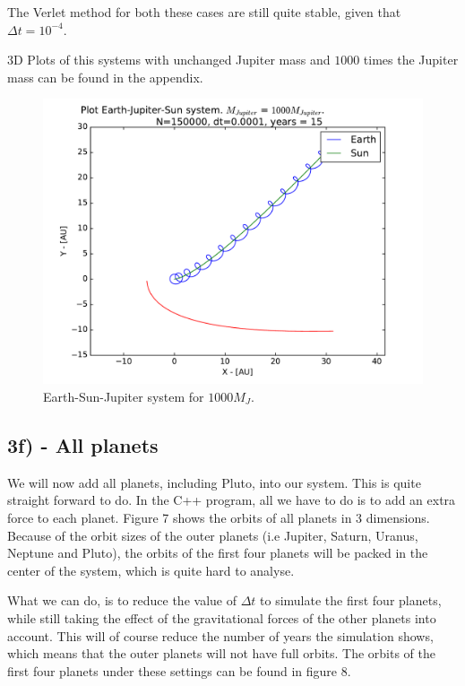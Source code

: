 \documentclass[12pt]{article}
\begin{document}
The Verlet method for both these cases are still quite stable, given that $\Delta t = 10^{-4}$. 

3D Plots of this systems with unchanged Jupiter mass and $1000$ times the Jupiter mass can be found in the appendix.

\begin{figure}[!h]
\centering
\includegraphics[width=\linewidth]{Plots/Earth_Sun_Jupiter_1000MJ.pdf}
\caption{Earth-Sun-Jupiter system for $1000M_J$.}
\label{fig:ESJ_1000MJ}
\end{figure}

\FloatBarrier

\subsection*{3f) - All planets}
We will now add all planets, including Pluto, into our system. This is quite straight forward to do. In the C++ program, all we have to do is to add an extra force to each planet. Figure 7 shows the orbits of all planets in 3 dimensions. Because of the orbit sizes of the outer planets (i.e Jupiter, Saturn, Uranus, Neptune and Pluto), the orbits of the first four planets will be packed in the center of the system, which is quite hard to analyse. 

What we can do, is to reduce the value of $\Delta t$ to simulate the first four planets, while still taking the effect of the gravitational forces of the other planets into account. This will of course reduce the number of years the simulation shows, which means that the outer planets will not have full orbits. The orbits of the first four planets under these settings can be found in figure 8.
\end{document}
